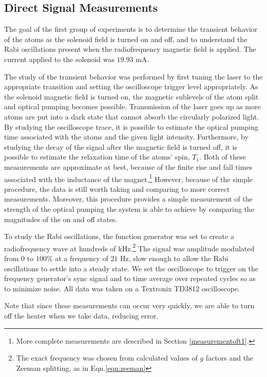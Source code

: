 \subsection{Direct Signal Measurements}\label{directsignalmeasurements}

The goal of the first group of experiments is to determine the transient behavior of the atoms as the solenoid field is turned on and off, and to understand the Rabi oscillations present when the radiofrequency magnetic field is applied. The current applied to the solenoid was $19.93$ mA.

The study of the transient behavior was performed by first tuning the laser to the appropriate transition and setting the oscilloscope trigger level appropriately. As the solenoid magnetic field is turned on, the magnetic sublevels of the atom split and optical pumping becomes possible. Transmission of the laser goes up as more atoms are put into a dark state that cannot absorb the circularly polarized light. By studying the oscilloscope trace, it is possible to estimate the optical pumping time associated with the atoms and the given light intensity. Furthermore, by studying the decay of the signal after the magnetic field is turned off, it is possible to estimate the relaxation time of the atoms' spin, $T_{1}$. Both of these measurements are approximate at best, because of the finite rise and fall times associated with the inductance of the magnet.\footnote{More complete measurements are described in Section \ref{measurementoft1}.} However, because of the simple procedure, the data is still worth taking and comparing to more correct measurements. Moreover, this procedure provides a simple measurement of the strength of the optical pumping the system is able to achieve by comparing the magnitudes of the on and off states.

To study the Rabi oscillations, the function generator was set to create a radiofrequency wave at hundreds of kHz.\footnote{The exact frequency was chosen from calculated values of $g$ factors and the Zeeman splitting, as in Eqn.\ref{eqn:zeeman}} The signal was amplitude modulated from $0$ to $100\%$ at a frequency of $21$ Hz, slow enough to allow the Rabi oscillations to settle into a steady state. We set the oscilloscope to trigger on the frequency generator's sync signal and to time average over repeated cycles so as to minimize noise. All data was taken on a Textronix TD3812 oscilloscope.

Note that since these measurements can occur very quickly, we are able to turn off the heater when we take data, reducing error.

